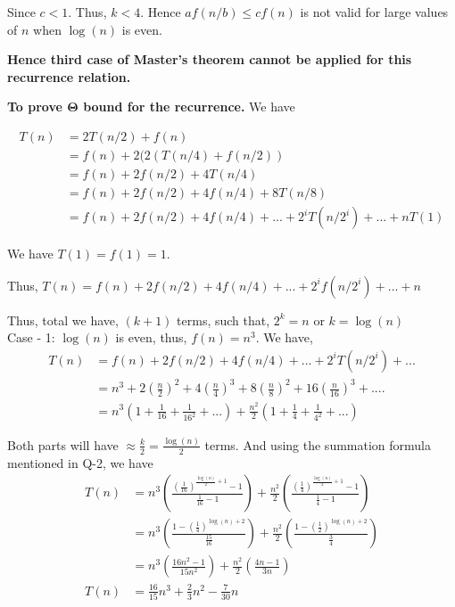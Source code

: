 \documentclass[11pt]{article}
\begin{document}
Since $c<1$. Thus, $k<4$. Hence $af(n/b) \leq cf(n)$ is not valid for large values of $n$ when $\log(n)$ is even.

\textbf{Hence third case of Master's theorem cannot be applied for this recurrence relation.}

\newpage

\textbf{To prove $\mathbf{\Theta}$ bound for the recurrence.}
We have

\begin{equation}
    \begin{split}
        T(n) & = 2T(n/2) + f(n)\\
        & = f(n) + 2(2(T(n/4) + f(n/2))\\
        & = f(n) + 2f(n/2) + 4T(n/4)\\
        & = f(n)+ 2f(n/2)+ 4f(n/4) + 8T(n/8)\\
        & = f(n)+ 2f(n/2)+ 4f(n/4) +...+ 2^iT(n/2^i)+ ... + nT(1)
    \end{split}
\end{equation}

We have $T(1) = f(1) = 1$.

Thus, $T(n) = f(n)+ 2f(n/2)+ 4f(n/4) +...+ 2^if(n/2^i)+ ... + n$

Thus, total we have, $(k+1)$ terms, such that, $2^k = n$ or $k = \log(n)$\\

Case - 1: $\log(n)$ is even, thus, $f(n) = n^3$.
We have,
\begin{equation}
    \begin{split}
        T(n) & = f(n)+ 2f(n/2)+ 4f(n/4) +...+ 2^iT(n/2^i)+ ...\\
        & = n^3 + 2(\frac{n}{2})^2+4(\frac{n}{4})^3+8(\frac{n}{8})^2+16(\frac{n}{16})^3+....\\
        &= n^3\left(1+\frac{1}{16}+\frac{1}{16^2}+...\right) + \frac{n^2}{2}\left(1+\frac{1}{4}+\frac{1}{4^2}+...\right)
    \end{split}
\end{equation}

Both parts will have $\approx \frac{k}{2} = \frac{\log(n)}{2}$ terms. And using the summation formula mentioned in Q-2, we have
\begin{equation}
    \begin{split}
        T(n) &= n^3\left(\frac{(\frac{1}{16})^{\frac{\log(n)}{2}+1}-1}{\frac{1}{16}-1}\right) + \frac{n^2}{2}\left(\frac{(\frac{1}{4})^{\frac{\log(n)}{2}+1}-1}{\frac{1}{4}-1}\right)\\
        &= n^3\left(\frac{1-(\frac{1}{4})^{\log(n)+2}}{\frac{15}{16}}\right) + \frac{n^2}{2}\left(\frac{1-(\frac{1}{2})^{\log(n)+2}}{\frac{3}{4}}\right)\\
        &= n^3\left(\frac{16n^2-1}{15n^2}\right) + \frac{n^2}{2}\left(\frac{4n-1}{3n}\right)\\
        T(n) &= {\frac{16}{15}n^3 + \frac{2}{3}n^2 - \frac{7}{30}n}
    \end{split}
\end{equation}
\end{document}
